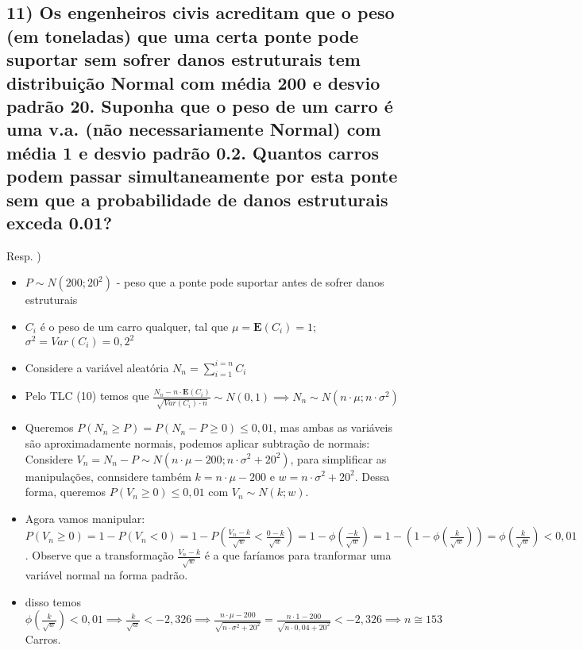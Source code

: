 \documentclass[english]{article}
\begin{document}
\subsection*{\textcompwordmark{}}


\subsection*{\textmd{11) Os engenheiros civis acreditam que o peso (em toneladas)
que uma certa ponte pode suportar sem sofrer danos estruturais tem
distribuição Normal com média 200 e desvio padrão 20. Suponha que
o peso de um carro é uma v.a. (não necessariamente Normal) com média
1 e desvio padrão 0.2. Quantos carros podem passar simultaneamente
por esta ponte sem que a probabilidade de danos estruturais exceda
0.01?}}

Resp. )
\begin{itemize}
\item $P\sim N(200;20^{2})$ - peso que a ponte pode suportar antes de sofrer
danos estruturais
\item $C_{i}$ é o peso de um carro qualquer, tal que $\mu=\mathbf{E}(C_{i})=1$;
$\sigma^{2}=Var(C_{i})=0,2^{2}$
\item Considere a variável aleatória $N_{n}=\sum_{i=1}^{i=n}C_{i}$
\item Pelo TLC (10) temos que $\frac{N_{n}-n\cdot\mathbf{E}(C_{i})}{\sqrt{Var(C_{i})\cdot n}}\sim N(0,1)\implies N_{n}\sim N(n\cdot\mu;n\cdot\sigma^{2})$
\item Queremos $P(N_{n}\ge P)=P(N_{n}-P\ge0)\le0,01$, mas ambas as variáveis
são aproximadamente normais, podemos aplicar subtração de normais:
Considere $V_{n}=N_{n}-P\sim N(n\cdot\mu-200;n\cdot\sigma^{2}+20^{2})$,
para simplificar as manipulações, connsidere também $k=n\cdot\mu-200$
e $w=n\cdot\sigma^{2}+20^{2}$. Dessa forma, queremos $P(V_{n}\ge0)\le0,01$
com $V_{n}\sim N(k;w)$.
\item Agora vamos manipular: $P(V_{n}\ge0)=1-P(V_{n}<0)=1-P(\frac{V_{n}-k}{\sqrt{w}}<\frac{0-k}{\sqrt{w}})=1-\phi(\frac{-k}{\sqrt{w}})=1-(1-\phi(\frac{k}{\sqrt{w}}))=\phi(\frac{k}{\sqrt{w}})<0,01$.
Observe que a transformação $\frac{V_{n}-k}{\sqrt{w}}$ é a que faríamos
para tranformar uma variável normal na forma padrão.
\item disso temos $\phi(\frac{k}{\sqrt{w}})<0,01\implies\frac{k}{\sqrt{w}}<-2,326\implies\frac{n\cdot\mu-200}{\sqrt{n\cdot\sigma^{2}+20^{2}}}=\frac{n\cdot1-200}{\sqrt{n\cdot0,04+20^{2}}}<-2,326\implies n\cong153$
Carros.
\end{itemize}
\end{document}
